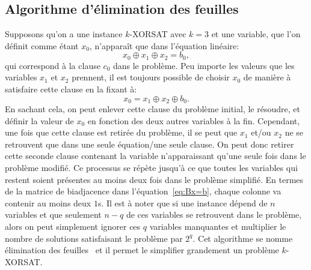 \subsection{Algorithme d'élimination des feuilles}\label{subsec:leaf-removal-algorithm}
Supposons qu'on a une instance $k$-XORSAT avec $k = 3$ et une variable, que l'on définit comme étant $x_0$, n'apparaît que dans l'équation linéaire:
\begin{equation}\label{eq:c0-example}
    x_0 \oplus x_1 \oplus x_2 = b_0,
\end{equation}
qui correspond à la clause $c_0$ dans le problème.
Peu importe les valeurs que les variables $x_1$ et $x_2$ prennent, il est toujours possible de choisir $x_0$ de manière à satisfaire cette clause en la fixant à:
\begin{equation}\label{eq:x0-value}
    x_0 = x_1 \oplus x_2 \oplus b_0.
\end{equation}
En sachant cela, on peut enlever cette clause du problème initial, le résoudre, et définir la valeur de $x_0$ en fonction des deux autres variables à la fin.
Cependant, une fois que cette clause est retirée du problème, il se peut que $x_1$ et/ou $x_2$ ne se retrouvent que dans une seule équation/une seule clause.
On peut donc retirer cette seconde clause contenant la variable n'apparaissant qu'une seule fois dans le problème modifié.
Ce processus se répète jusqu'à ce que toutes les variables qui restent soient présentes au moins deux fois dans le problème simplifié.
En termes de la matrice de biadjacence dans l'équation~\ref{eq:Bx=b}, chaque colonne va contenir au moins deux $1$s.
Il est à noter que si une instance dépend de $n$ variables et que seulement $n - q$ de ces variables se retrouvent dans le problème, alors on peut simplement ignorer ces $q$ variables manquantes et multiplier le nombre de solutions satisfaisant le problème par $2^q$.
Cet algorithme se nomme élimination des feuilles~\cite{mezard_alternative_2002, cocco_rigorous_2003} et il permet le simplifier grandement un problème $k$-XORSAT.

